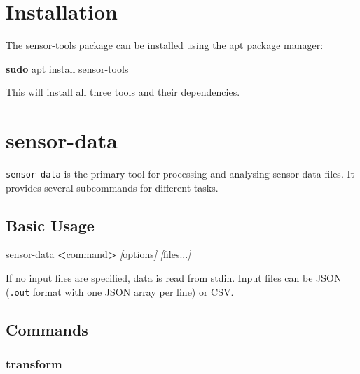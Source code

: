 \documentclass[
]{book}
\newenvironment{Shaded}{\begin{snugshade}}{\end{snugshade}}
\newcommand{\ExtensionTok}[1]{#1}
\newcommand{\FunctionTok}[1]{\textcolor[rgb]{0.13,0.29,0.53}{\textbf{#1}}}
\newcommand{\NormalTok}[1]{#1}
\newcommand{\OperatorTok}[1]{\textcolor[rgb]{0.81,0.36,0.00}{\textbf{#1}}}
\newcommand{\PreprocessorTok}[1]{\textcolor[rgb]{0.56,0.35,0.01}{\textit{#1}}}
\newcommand{\SpecialStringTok}[1]{\textcolor[rgb]{0.31,0.60,0.02}{#1}}
\begin{document}
\section{Installation}\label{installation}

The sensor-tools package can be installed using the apt package manager:

\begin{Shaded}
\begin{Highlighting}[]
\FunctionTok{sudo}\NormalTok{ apt install sensor{-}tools}
\end{Highlighting}
\end{Shaded}

This will install all three tools and their dependencies.

\section{sensor-data}\label{sensor-data}

\texttt{sensor-data} is the primary tool for processing and analysing sensor data files. It provides several subcommands for different tasks.

\subsection{Basic Usage}\label{basic-usage}

\begin{Shaded}
\begin{Highlighting}[]
\ExtensionTok{sensor{-}data} \OperatorTok{\textless{}}\NormalTok{command}\OperatorTok{\textgreater{}} \PreprocessorTok{[}\SpecialStringTok{options}\PreprocessorTok{]} \PreprocessorTok{[}\SpecialStringTok{files...}\PreprocessorTok{]}
\end{Highlighting}
\end{Shaded}

If no input files are specified, data is read from stdin. Input files can be JSON (\texttt{.out} format with one JSON array per line) or CSV.

\subsection{Commands}\label{commands}

\subsubsection{transform}\label{transform}
\end{document}
